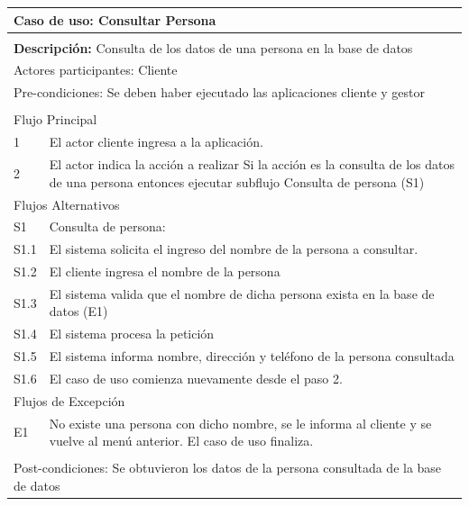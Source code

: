 \documentclass[11pt]{article}
\begin{document}
\begin{tabular}{|l|m{}|}
    \hline
    \multicolumn{2}{|m{0.9\textwidth}|}{{\bf Caso de uso: Consultar Persona}} \\
    \hline
    \multicolumn{2}{|l|}{\rowcolor[gray]{.5}} \\
    \hline
  
    \multicolumn{2}{|p{0.9\textwidth}|}{{\bf Descripción:} Consulta de los datos de una 
    persona en la base de datos } \\
  
    \hline
    \multicolumn{2}{|l|}{Actores participantes: Cliente} \\
    \hline
  
    \multicolumn{2}{|l|}{Pre-condiciones: Se deben haber ejecutado las aplicaciones cliente 
    y gestor} \\
  
    \hline
    \multicolumn{2}{|l|}{\rowcolor[gray]{.5}} \\
    \hline
    \multicolumn{2}{|l|}{Flujo Principal} \\
    \hline
    1 & El actor cliente ingresa a la aplicaci\'on. \\
    \hline
    2 &  El actor indica la acción a realizar \newline
    Si la acción es la consulta de los datos de una persona entonces ejecutar subflujo Consulta de persona (S1)\newline
   \\
    
    \hline
    \multicolumn{2}{|l|}{Flujos Alternativos} \\
    \hline
  
    S1 &  Consulta de persona: \\ \hline
    S1.1 & El sistema solicita el ingreso del nombre de la persona a consultar.\\ \hline
    S1.2 & El cliente ingresa el nombre de la persona\\ \hline
    S1.3 & El sistema valida que el nombre de dicha persona exista en la base de datos (E1) \\ \hline
    S1.4 & El sistema procesa la petici\'on\\ \hline
    S1.5 & El sistema informa nombre, direcci\'on y tel\'efono de la persona consultada\\ \hline
    S1.6 & El caso de uso comienza nuevamente desde el paso 2.\\ \hline
    
    \multicolumn{2}{|l|}{Flujos de Excepción} \\
    \hline
  
    E1 & No existe una persona con dicho nombre, se le informa al cliente y se vuelve al men\'u anterior. 
    El caso de uso finaliza.\\
  
    \hline
    \multicolumn{2}{|l|}{\rowcolor[gray]{.5}} \\
    \hline
  
    \multicolumn{2}{|m{0.9\textwidth}|}{Post-condiciones: Se obtuvieron los datos de la persona consultada de la base de datos} \\
  
    \hline
  \end{tabular}
\end{document}
